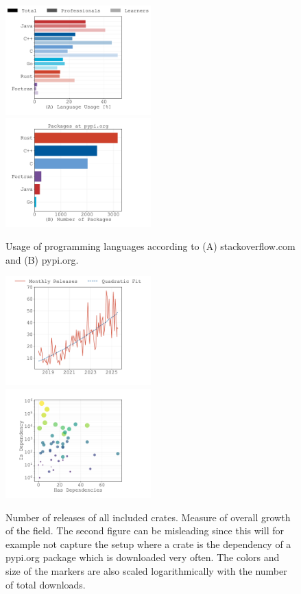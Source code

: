 \documentclass{article}
\begin{document}
\begin{figure}
    \centering
    \includegraphics[width=0.5\textwidth]{figures/stackoverflow-popular-languages.pdf}%
    \includegraphics[width=0.5\textwidth]{figures/pypi-org-used-languages.pdf}
    \caption{
        Usage of programming languages according to (A) stackoverflow.com and (B) pypi.org.
    }
    \label{fig:stackoverflow-popular-languages}
\end{figure}
\begin{figure}
    \centering
    \includegraphics[width=0.5\textwidth]{figures/crates-io-release-numbers.pdf}%
    \includegraphics[width=0.5\textwidth]{figures/crates-io-deps-downloads-scatter.pdf}
    \caption{
        Number of releases of all included crates.
        Measure of overall growth of the field.
        The second figure can be misleading since this will for example not capture the setup where
        a crate is the dependency of a pypi.org package which is downloaded very often.
        The colors and size of the markers are also scaled logarithmically with the number of total
        downloads.
    }
\end{figure}
\end{document}
